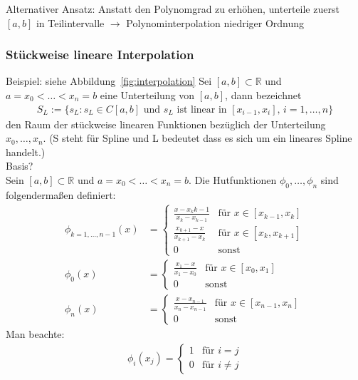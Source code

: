 Alternativer Ansatz: Anstatt den Polynomgrad zu erhöhen, unterteile zuerst $[a,b]$ in Teilintervalle
$\rightarrow$ Polynominterpolation niedriger Ordnung

\subsubsection{Stückweise lineare Interpolation}
Beispiel: siehe Abbildung~\ref{fig:interpolation}
Sei $[a,b] \subset \mathbb{R}$ und $a=x_0<\ldots<x_n=b$ eine Unterteilung von $[a,b]$, dann bezeichnet
\begin{align*}
  S_L:=\{s_L:s_L\in C[a,b] \text{ und } s_L \text{ ist linear in } [x_{i-1},x_i],\,i=1,\ldots,n\}
\end{align*}
den Raum der stückweise linearen Funktionen bezüglich der Unterteilung $x_0,\ldots,x_n$.
(S steht für Spline und L bedeutet dass es sich um ein lineares Spline handelt.)\\
Basis?\\
Sein $[a,b] \subset \mathbb{R}$ und $a=x_0<\ldots<x_n=b$. Die Hutfunktionen $\phi_0,\ldots,\phi_n$
sind folgendermaßen definiert:
\begin{align*}
  \phi_{k=1,\ldots,n-1}(x) &= \begin{cases}
    \frac{x-x_k{k-1}}{x_k-x_{k-1}} &\mbox{für } x\in[x_{k-1},x_k]\\
    \frac{x_{k+1}-x}{x_{k+1}-x_k} &\mbox{für } x\in[x_k,x_{k+1}]\\
    0 &\mbox{sonst}
  \end{cases}\\
  \phi_0(x) &= \begin{cases}
    \frac{x_1-x}{x_1-x_0} &\mbox{für } x\in[x_0,x_1]\\
    0 &\mbox{sonst}
  \end{cases}\\
  \phi_n(x) &= \begin{cases}
    \frac{x-x_{n-1}}{x_n-x_{n-1}} &\mbox{für } x\in[x_{n-1},x_n]\\
    0 &\mbox{sonst}
  \end{cases}
\end{align*}
Man beachte:
\begin{align*}
  \phi_i(x_j) = \begin{cases}
    1 &\mbox{für } i=j\\
    0 &\mbox{für } i \neq j
  \end{cases}
\end{align*}

